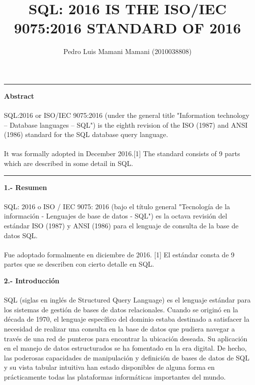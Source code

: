 \documentclass[preprint,12pt]{article}
\title{SQL: 2016 IS THE ISO/IEC 9075:2016 STANDARD OF 2016}
\author{Pedro Luis Mamani Mamani (2010038808)}
\begin{document}
\maketitle

\rule{170mm}{0.1mm}
\begin{justify}
\textbf{Abstract}  \\\\ SQL:2016 or ISO/IEC 9075:2016 (under the general title "Information technology – Database languages – SQL") is the eighth revision of the ISO (1987) and ANSI (1986) standard for the SQL database query language. \\\\ It was formally adopted in December 2016.[1] The standard consists of 9 parts which are described in some detail in SQL. 
\end{justify}

\rule{170mm}{0.1mm}
\begin{justify}
\textbf{1.- Resumen}  \\\\ SQL: 2016 o ISO / IEC 9075: 2016 (bajo el título general "Tecnología de la información - Lenguajes de base de datos - SQL") es la octava revisión del estándar ISO (1987) y ANSI (1986) para el lenguaje de consulta de la base de datos SQL. \\\\ Fue adoptado formalmente en diciembre de 2016. [1] El estándar consta de 9 partes que se describen con cierto detalle en SQL.
\end{justify}


\begin{justify}
\textbf{2.- Introducción}  \\\\ 
SQL (siglas en inglés de Structured Query Language) es el lenguaje estándar para los sistemas de gestión de bases de datos relacionales. Cuando se originó en la década de 1970, el lenguaje específico del dominio estaba destinado a satisfacer la necesidad de realizar una consulta en la base de datos que pudiera navegar a través de una red de punteros para encontrar la ubicación deseada. Su aplicación en el manejo de datos estructurados se ha fomentado en la era digital. De hecho, las poderosas capacidades de manipulación y definición de bases de datos de SQL y su vista tabular intuitiva han estado disponibles de alguna forma en prácticamente todas las plataformas informáticas importantes del mundo.\\\\
\end{justify}
\end{document}
